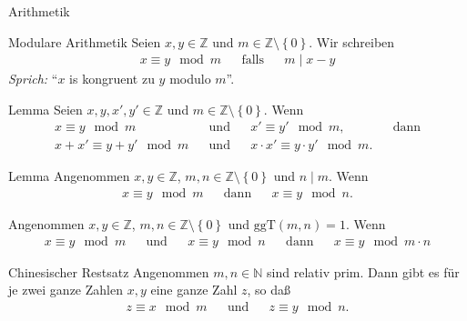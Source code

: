 \documentclass[aspectratio=1610, 11pt]{beamer}
\newcommand\NN{\mathbb N}
\newcommand\ZZ{\mathbb Z}
\newcommand\cbc[1]{\left\{{#1}\right\}}
\newcommand{\ggt}{\mathrm{ggT}}
\begin{document}
\begin{frame}{Arithmetik}
	\begin{overprint}
\begin{exampleblock}{Modulare Arithmetik}
		Seien $x,y\in\ZZ$ und $m\in\ZZ\setminus\cbc 0$.
		Wir schreiben
		\begin{align*}
			x\equiv y\mod m&&\mbox{falls}&&m\mid x-y
		\end{align*}
		\emph{Sprich:} ``$x$ is kongruent zu $y$ modulo $m$''.
	\end{exampleblock}
\begin{block}{Lemma}
	Seien $x,y,x',y'\in\ZZ$ und $m\in\ZZ\setminus\cbc 0$.
	Wenn
	\begin{align*}
		x\equiv y\mod m&&\mbox{und}&&x'\equiv y'\mod m,&&\mbox{dann}\\
		x+x'\equiv y+y'\mod m&&\mbox{und}&&x\cdot x'\equiv y\cdot y'\mod m.
	\end{align*}
\end{block}
\begin{block}{Lemma}
	Angenommen $x,y\in\ZZ$, $m,n\in\ZZ\setminus\cbc 0$ und $n\mid m$.	
	Wenn
	\begin{align*}
		x\equiv y\mod m&&\mbox{dann}&&x\equiv y\mod n.
	\end{align*}
\end{block}
\begin{block}
	Angenommen $x,y\in\ZZ$, $m,n\in\ZZ\setminus\cbc 0$ und $\ggt(m,n)=1$.	
	Wenn
	\begin{align*}
		x\equiv y\mod m&&\mbox{und}&&x\equiv y\mod n&&\mbox{dann}&&x\equiv y\mod m\cdot n
	\end{align*}
\end{block}
\begin{block}{Chinesischer Restsatz}
	Angenommen $m,n\in\NN$ sind relativ prim.
	Dann gibt es f\"ur je zwei ganze Zahlen $x,y$ eine ganze Zahl $z$, so da\ss\
	\begin{align*}
		z\equiv x\mod m&&\mbox{und}&&z\equiv y\mod n.
	\end{align*}
\end{block}
	\end{overprint}
\end{frame}
\end{document}
